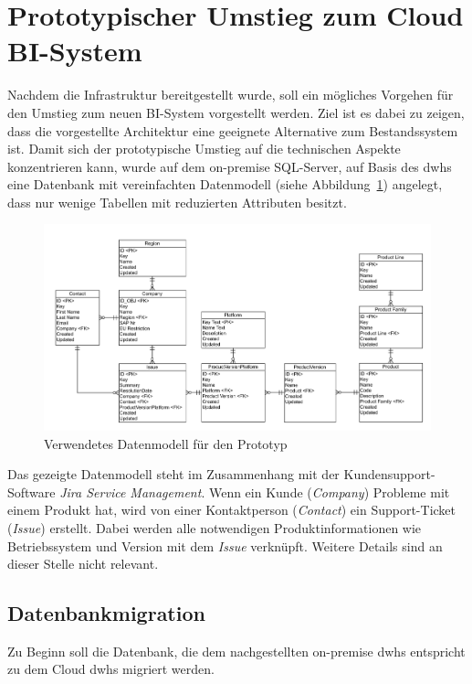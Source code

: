 \section{Prototypischer Umstieg zum Cloud BI-System} \label{sec:praktischeUmsetzung:Migration}
Nachdem die Infrastruktur bereitgestellt wurde, soll ein mögliches Vorgehen für den Umstieg zum neuen BI-System vorgestellt werden. Ziel ist es dabei zu zeigen, dass die vorgestellte Architektur eine geeignete Alternative zum Bestandssystem ist. Damit sich der prototypische Umstieg auf die technischen Aspekte konzentrieren kann, wurde auf dem on-premise SQL-Server, auf Basis des \acp{dwh} eine Datenbank mit vereinfachten Datenmodell (siehe Abbildung~\ref{fig:praktischeUmsetzung:dataModel}) angelegt, dass nur wenige Tabellen mit reduzierten Attributen besitzt. 

\begin{figure}[htbp]
 \centering
 \includegraphics[width=\textwidth]{gfx/data_model.png}
 \caption{Verwendetes Datenmodell für den Prototyp}
\label{fig:praktischeUmsetzung:dataModel}
\end{figure}

\noindent Das gezeigte Datenmodell steht im Zusammenhang mit der Kundensupport-Software \textit{Jira Service Management}. Wenn ein Kunde (\textit{Company}) Probleme mit einem Produkt hat, wird von einer Kontaktperson (\textit{Contact}) ein Support-Ticket (\textit{Issue}) erstellt. Dabei werden alle notwendigen Produktinformationen wie Betriebssystem und Version mit dem \textit{Issue} verknüpft. Weitere Details sind an dieser Stelle nicht relevant.

\subsection{Datenbankmigration} \label{subsec:praktischeUmsetzung:Datenmigration}
Zu Beginn soll die Datenbank, die dem nachgestellten on-premise \acp{dwh} entspricht zu dem Cloud \acp{dwh} migriert werden. 

